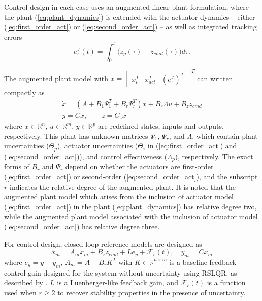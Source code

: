Control design in each case uses an augmented linear plant formulation, where the plant (\ref{eq:plant_dynamics}) is extended with the actuator dynamics -- either (\ref{eq:first_order_act}) or (\ref{eq:second_order_act}) -- as well as integrated tracking errors 
\begin{equation}
	e_z^{\mathcal{I}}(t) = \int_0^{t} \big( z_p(\tau) - z_{cmd}(\tau)\big) d\tau.
\end{equation}

The augmented plant model with $x = \begin{bmatrix} x_p^T & x_{act}^T & (e_z^{\mathcal{I}})^T\end{bmatrix}^T$ can written compactly as
\begin{equation}
\begin{array}{c}
\dot{x}= \left(A+B_{1}\Psi_{1}^{T}+B_{r}\Psi_{r}^{T}\right) x+B_{r}\Lambda u+B_{z}z_{cmd}\\
y=Cx,\qquad z=C_{z}x
\end{array} \label{eq:augmented_plant}
\end{equation}
where $x\in\mathbb{R}^{n}$, $u\in\mathbb{R}^{m}$, $y\in\mathbb{R}^{p}$ are redefined states, inputs and outputs, respectively. 
This plant has unknown matrices $\Psi_1$, $\Psi_r$, and $\Lambda$, which contain plant uncertainties ($\Theta_p$), actuator uncertainties ($\Theta_i$ in (\ref{eq:first_order_act}) and (\ref{eq:second_order_act})), and control effectiveness ($\Lambda_p$), respectively. The exact forms of $B_r$ and $\Psi_r$ depend on whether the actuators are first-order (\ref{eq:first_order_act}) or second-order (\ref{eq:second_order_act}), and the subscript $r$ indicates the relative degree of the augmented plant. It is noted that the augmented plant model which arises from the inclusion of actuator model (\ref{eq:first_order_act}) in the plant (\ref{eq:plant_dynamics}) has relative degree two, while the augmented plant model associated with the inclusion of actuator model (\ref{eq:second_order_act}) has relative degree three. 

For control design, closed-loop reference models \cite{gibson2013adaptive} are designed as
\begin{equation}
\dot{x}_m = A_m x_m + B_z z_{cmd} + L e_y + \mathcal{F}_r(t), \quad y_m = C x_m
\end{equation}
where $e_y = y - y_m$, $A_m = A - B_r K^T$ with $K\in\mathbb{R}^{n\times m}$ is a baseline feedback control gain designed for the system without uncertainty using RSLQR, as described by \cite{lavretsky2013robust}. $L$ is a Luenberger-like feedback gain, and $\mathcal{F}_r(t)$ is a function used when $r \geq 2$ to recover stability properties in the presence of uncertainty. 

